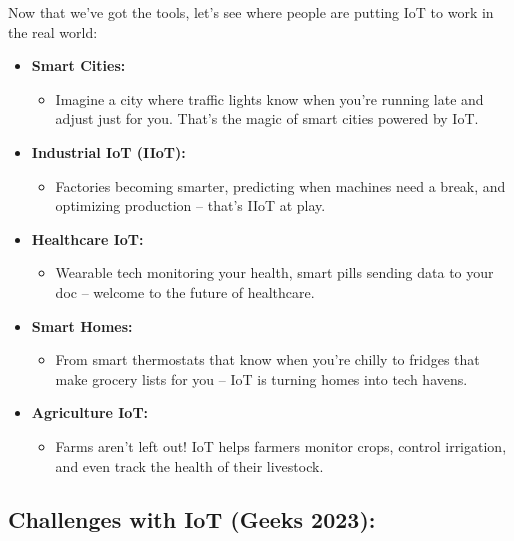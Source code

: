 \documentclass[
  letterpaper,
  DIV=11,
  numbers=noendperiod]{scrreprt}
\providecommand{\tightlist}{%
  \setlength{\itemsep}{0pt}\setlength{\parskip}{0pt}}\usepackage{longtable,booktabs,array}
\begin{document}
Now that we've got the tools, let's see where people are putting IoT to
work in the real world:

\begin{itemize}
\item
  \textbf{Smart Cities:}

  \begin{itemize}
  \tightlist
  \item
    Imagine a city where traffic lights know when you're running late
    and adjust just for you. That's the magic of smart cities powered by
    IoT.
  \end{itemize}
\item
  \textbf{Industrial IoT (IIoT):}

  \begin{itemize}
  \tightlist
  \item
    Factories becoming smarter, predicting when machines need a break,
    and optimizing production -- that's IIoT at play.
  \end{itemize}
\item
  \textbf{Healthcare IoT:}

  \begin{itemize}
  \tightlist
  \item
    Wearable tech monitoring your health, smart pills sending data to
    your doc -- welcome to the future of healthcare.
  \end{itemize}
\item
  \textbf{Smart Homes:}

  \begin{itemize}
  \tightlist
  \item
    From smart thermostats that know when you're chilly to fridges that
    make grocery lists for you -- IoT is turning homes into tech havens.
  \end{itemize}
\item
  \textbf{Agriculture IoT:}

  \begin{itemize}
  \tightlist
  \item
    Farms aren't left out! IoT helps farmers monitor crops, control
    irrigation, and even track the health of their livestock.
  \end{itemize}
\end{itemize}

\subsection{Challenges with IoT (Geeks
2023):}\label{challenges-with-iot-geeks_for_geeks_iot_challenges}
\end{document}
